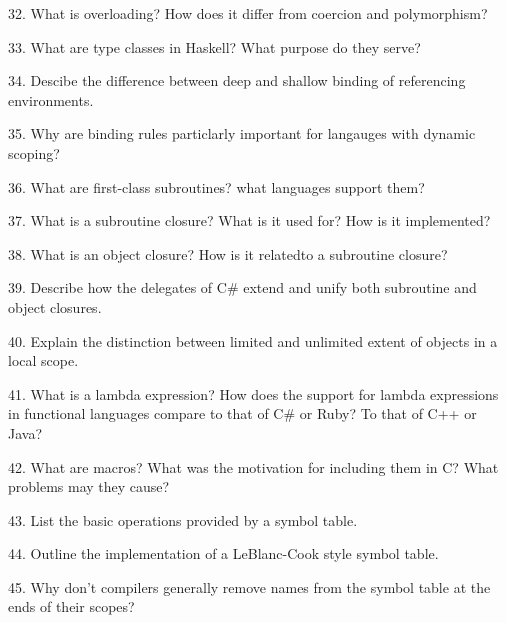 32. What is overloading? How does it differ from coercion and polymorphism?

\filbreak
\vskip 1cm

33. What are type classes in Haskell? What purpose do they serve?

\filbreak
\vskip 1cm

34. Descibe the difference between deep and shallow binding of referencing environments.

\filbreak
\vskip 1cm

35. Why are binding rules particlarly important for langauges with dynamic scoping?

\filbreak
\vskip 1cm

36. What are first-class subroutines? what languages support them?

\filbreak
\vskip 1cm

37. What is a subroutine closure? What is it used for? How is it implemented?

\filbreak
\vskip 1cm

38. What is an object closure? How is it relatedto a subroutine closure?

\filbreak
\vskip 1cm

39. Describe how the delegates of C$\#$ extend and unify both subroutine and object closures.

\filbreak
\vskip 1cm

40. Explain the distinction between limited and unlimited extent of objects in a local scope.

\filbreak
\vskip 1cm

41. What is a lambda expression? How does the support for lambda expressions in functional languages compare to that of C$\#$ or Ruby? To that of C++ or Java?

\filbreak
\vskip 1cm

42. What are macros? What was the motivation for including them in C? What problems may they cause?

\filbreak
\vskip 1cm

43. List the basic operations provided by a symbol table.

\filbreak
\vskip 1cm

44. Outline the implementation of a LeBlanc-Cook style symbol table.

\filbreak
\vskip 1cm

45. Why don't compilers generally remove names from the symbol table at the ends of their scopes?

\filbreak
\vskip 1cm

